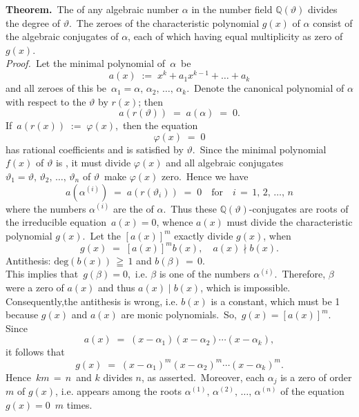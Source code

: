 \documentclass[12pt]{article}
\theoremstyle{definition}
\begin{document}
 

\textbf{Theorem.}\, The  of any algebraic number $\alpha$ in the number field $\mathbb{Q}(\vartheta)$ divides the degree of $\vartheta$.\, The zeroes of the characteristic polynomial $g(x)$ of $\alpha$ consist of the algebraic conjugates of $\alpha$, each of which having equal multiplicity as zero of $g(x)$.
\\

\emph{Proof.}\, Let the minimal polynomial of \,$\alpha$\, be
$$a(x) \;:=\; x^k+a_1x^{k-1}+\ldots+a_k$$
and all zeroes of this be\, $\alpha_1 = \alpha,\,\alpha_2,\,\ldots,\,\alpha_k$.\, Denote the canonical polynomial of 
$\alpha$ with respect to the  $\vartheta$ by $r(x)$; then 
$$a(r(\vartheta)) \;=\; a(\alpha) \;=\; 0.$$
If\, $a(r(x)) \;:=\; \varphi(x)$,\, then the equation
$$\varphi(x) \;=\; 0$$
has rational coefficients and is satisfied by $\vartheta$.\, Since the minimal polynomial $f(x)$ of $\vartheta$ is , it must divide $\varphi(x)$ and all algebraic conjugates\, 
$\vartheta_1 = \vartheta,\,\vartheta_2,\,\ldots,\,\vartheta_n$ of $\vartheta$\, make $\varphi(x)$ zero.\, Hence we have
$$a(\alpha^{(i)}) \;=\; a(r(\vartheta_i)) \;=\; 0 \quad \mbox{for}\quad i \,=\, 1,\,2,\,\ldots,\,n$$
where the numbers $\alpha^{(i)}$ are the 
 of $\alpha$.\, Thus these 
$\mathbb{Q}(\vartheta)$-conjugates are roots of the irreducible equation \,$a(x) = 0$, whence $a(x)$ must divide the characteristic polynomial $g(x)$.\, Let the  
$[a(x)]^m$ exactly divide $g(x)$, when
$$g(x) \;=\; [a(x)]^mb(x), \quad a(x) \nmid b(x).$$
Antithesis:\; $\mbox{deg}(b(x)) \,\geqq\, 1$ \;\; and\;\; $b(\beta) \,=\, 0$.\\
This implies that\, $g(\beta) = 0$,\, i.e. $\beta$ is one of the numbers $\alpha^{(i)}$.\, Therefore, $\beta$ were a zero of $a(x)$ and thus $a(x) \mid b(x)$, which is impossible.\, Consequently,the antithesis is wrong, i.e. $b(x)$ is a constant, which must be 1 because $g(x)$ and $a(x)$ are monic polynomials.\, So,\, $g(x) = [a(x)]^m$.\, Since
$$a(x) \;=\; (x\!-\!\alpha_1)(x\!-\!\alpha_2)\cdots(x\!-\!\alpha_k),$$
it follows that
$$g(x) \;=\; (x\!-\!\alpha_1)^m(x\!-\!\alpha_2)^m\cdots(x\!-\!\alpha_k)^m.$$
Hence\, $km \,=\, n$\, and $k$ divides $n$, as asserted.\, Moreover, each $\alpha_j$ is a zero of order $m$ of $g(x)$, i.e. appears among the roots $\alpha^{(1)},\,\alpha^{(2)},\,\ldots,\,\alpha^{(n)}$ of the equation\, $g(x) = 0$\, $m$ times.




\end{document}
